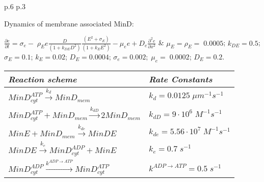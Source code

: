 \begin{minipage}{\linewidth}
\begin{tabular}[center]{p{.6\textwidth} p{.3\textwidth}}
        \newline
        \strut
        Dynamics of membrane associated MinD:
        \newline
        \strut
        \(\frac{{\partial e}}{{\partial t}} = {\sigma _e} - \;{\rho _E}e\frac{D}{{\left( {1 + {k_{DE}}{D^2}} \right)}}\frac{{\left( {{E^2} + {\sigma _E}} \right)}}{{\left( {1 + {k_E}{E^2}} \right)}} - {\mu _e}e + {D_e}\frac{{{\partial ^2}e}}{{\partial {x^2}}}\)
        &		\({\mu _E} = {\rho _E} = \;0.0005\);
        \({k_{DE}} = 0.5\); \({\sigma _E} = 0.1\);
        \({k_E} = 0.02\); \({D_E} = 0.0004\);
        \({\sigma _e} = 0.002;\;{\mu _e} = \;0.0002\);
        \({D_E} = 0.2\).	\\
        \hline
    \end{tabular}
\end{minipage}
\endgroup

\hfill

\hfill

\begingroup %
\noindent 
\begin{minipage}{\linewidth}
    \centering
    \begin{tabular}[center]{p{} p{}} %
        \textit{Reaction scheme}	&	\textit{Rate Constants}	\\
        \hline
        \(MinD_{cyt}^{ATP}\mathop  \to \limits^{{k_d}} Min{D_{mem}}\)	&		\({k_d} = 0.0125\;\mu {m^{ - 1}}{s^{ - 1}}\)	\\
        \hline
        \(MinD_{cyt}^{ATP} + Min{D_{mem}}\mathop  \to \limits^{{k_{dD}}} 2Min{D_{mem}}\)	&		\({k_{dD}} = 9\cdot{10^6}\;{M^{ - 1}}{s^{ - 1}}\) \\
        \hline
        \(MinE + Min{D_{mem}}\mathop  \to \limits^{{k_{de}}} MinDE\)	&	\({k_{de}} = 5.56\cdot{10^7}\;{M^{ - 1}}{s^{ - 1}}\)	\\
        \hline
        \(MinDE\mathop  \to \limits^{{k_e}} MinD_{cyt}^{ADP} + MinE\)	&		\({k_e} = 0.7\;{s^{ - 1}}\)	\\
        \hline
        \(MinD_{cyt}^{ADP}\mathop  \to \limits^{{k^{ADP \to ATP}}} MinD_{cyt}^{ATP}\)	&		\({k^{ADP \to ATP}} = 0.5\;{s^{ - 1}}\)	\\
        \hline
    \end{tabular}
\end{minipage}
\endgroup

